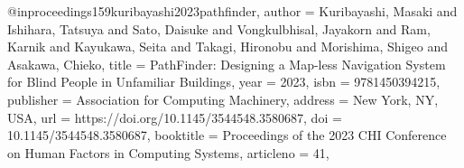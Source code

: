 @inproceedings{159kuribayashi2023pathfinder,
author = {Kuribayashi, Masaki and Ishihara, Tatsuya and Sato, Daisuke and Vongkulbhisal, Jayakorn and Ram, Karnik and Kayukawa, Seita and Takagi, Hironobu and Morishima, Shigeo and Asakawa, Chieko},
title = {PathFinder: Designing a Map-less Navigation System for Blind People in Unfamiliar Buildings},
year = {2023},
isbn = {9781450394215},
publisher = {Association for Computing Machinery},
address = {New York, NY, USA},
url = {https://doi.org/10.1145/3544548.3580687},
doi = {10.1145/3544548.3580687},
booktitle = {Proceedings of the 2023 CHI Conference on Human Factors in Computing Systems},
articleno = {41},
}